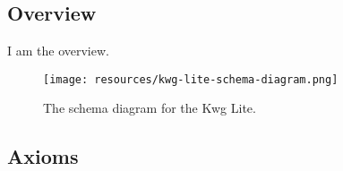 \subsection{Overview}
\label{ssec:overview}

I am the overview.

\begin{figure}[h!]
  \begin{center}
    \texttt{[image: resources/kwg-lite-schema-diagram.png]}
  \end{center}
  \caption{The schema diagram for the Kwg Lite.}
  \label{fig:ov-diagram}
\end{figure}


\subsection{Axioms}
